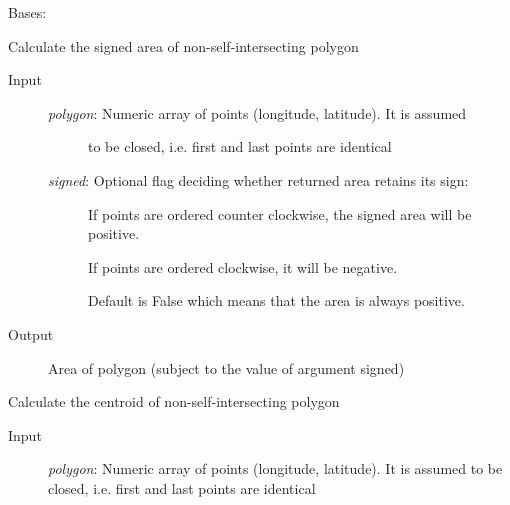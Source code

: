 \documentclass[letterpaper,10pt,english]{sphinxmanual}
\begin{document}
\begin{fulllineitems}
\label{Multi-robot motion planner:planning_sim.PolygonObstacle}
Bases: {\hyperref[Multi-robot motion planner:planning_sim.Obstacle]{}}

\begin{fulllineitems}
\label{Multi-robot motion planner:planning_sim.PolygonObstacle._calculate_polygon_area}
Calculate the signed area of non-self-intersecting polygon
\begin{description}
\item[{Input}] \leavevmode\begin{description}
\item[{\emph{polygon}: Numeric array of points (longitude, latitude). It is assumed}] \leavevmode
to be closed, i.e. first and last points are identical

\item[{\emph{signed}: Optional flag deciding whether returned area retains its sign:}] \leavevmode
If points are ordered counter clockwise, the signed area
will be positive.

If points are ordered clockwise, it will be negative.

Default is False which means that the area is always positive.

\end{description}

\item[{Output}] \leavevmode
Area of polygon (subject to the value of argument signed)

\end{description}

\end{fulllineitems}


\begin{fulllineitems}
\label{Multi-robot motion planner:planning_sim.PolygonObstacle._calculate_polygon_centroid}
Calculate the centroid of non-self-intersecting polygon
\begin{description}
\item[{Input}] \leavevmode
\emph{polygon}: Numeric array of points (longitude, latitude). It is assumed
to be closed, i.e. first and last points are identical


\end{description}
\end{fulllineitems}
\end{fulllineitems}
\end{document}
